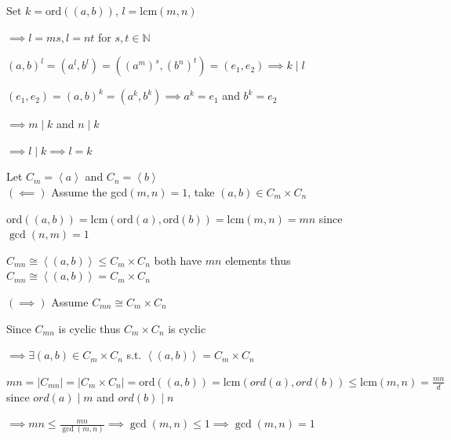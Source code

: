 \documentclass[12pt,letterpaper]{article}
\theoremstyle{definition}
\newcommand{\N}{\mathbb{N}}
\renewcommand{\t}[1]{\text{#1}}
\newcommand{\ang}[1]{\left\langle #1 \right\rangle}
\begin{document}
\begin{enumerate}[(a)]
    Set $k=\t{ord}((a,b))$, $l=\t{lcm}(m,n)$

    $\implies l=ms, l=nt$ for $s,t\in \N$

    $(a,b)^l=(a^l,b^l)=((a^m)^s,(b^n)^t)=(e_1,e_2) 
    \implies k \mid l$

    $(e_1,e_2)=(a,b)^k=(a^k,b^k) 
    \implies a^k=e_1$ and $b^k=e_2$

    $\implies m \mid k$ and $n \mid k$

    $\implies l \mid k \implies l = k$
    
    Let $C_m=\ang{a}$ and $C_n=\ang{b}$\\
    
    $(\impliedby)$ Assume the gcd$(m,n)=1$, 
    take $(a,b)\in C_m\times C_n$

    ord$((a,b))=\t{lcm}(\t{ord}(a),\t{ord}(b))=\t{lcm}(m,n)=mn$ since $\gcd(n,m)=1$

    $C_{mn}\cong\ang{(a,b)}\leq C_m\times C_n$ both have $mn$ elements
    thus  $C_{mn}\cong\ang{(a,b)}=C_m\times C_n$

    $(\implies)$ Assume $  C_{mn}\cong C_m\times C_n$

    Since $C_{mn}$ is cyclic thus $C_m\times C_n$ is cyclic

    $\implies \exists(a,b)\in C_m\times C_n$ s.t. 
    $\ang{(a,b)}= C_m\times C_n$

    $mn=| C_{mn}|=| C_m\times C_n|=\t{ord}((a,b))=\t{lcm}(ord(a),ord(b))
    \leq \t{lcm}(m,n)=\frac{mn}{d}$ since $ord(a) \mid m$ and $ord(b) \mid n$
    
    $\implies mn\leq \frac{mn}{\gcd(m,n)} \implies \gcd(m,n) \leq 1 \implies \gcd(m,n) = 1$
\end{enumerate}

\newpage
\end{document}
